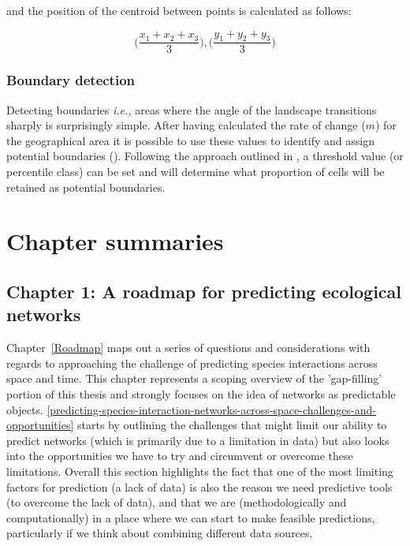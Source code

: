 \begin{refsection}
and the position of the centroid between points is calculated as follows:

$$ \Big( \frac{x_{1} + x_{2} + x_{3}}{3} \Big), \Big( \frac{y_{1} + y_{2} +
y_{3}}{3} \Big) $$

\subsubsection{Boundary detection}

Detecting boundaries \emph{i.e.,} areas where the angle of the landscape
transitions sharply is surprisingly simple. After having calculated the
rate of change (\(m\)) for the geographical area it is possible to use
these values to identify and assign potential boundaries
(\cite{Fortin2005SpaAna, Oden1993CatWom, Fortin1995DelEco}). Following the
approach outlined in \cite{Fortin2005SpaAna}, a threshold value (or
percentile class) can be set and will determine what proportion of cells
will be retained as potential boundaries.

\section{Chapter summaries}

\subsection{Chapter 1: A roadmap for predicting ecological networks}

Chapter~\ref{Roadmap} maps out a series of questions and considerations with regards to approaching the challenge of predicting species interactions across space and time. This chapter represents a scoping overview of the 'gap-filling' portion of this thesis and strongly focuses on the idea of networks as predictable objects. \autoref{predicting-species-interaction-networks-across-space-challenges-and-opportunities} starts by outlining the challenges that might limit our ability to predict networks (which is primarily due to a limitation in data) but also looks into the opportunities we have to try and circumvent or overcome these limitations. Overall this section highlights the fact that one of the most limiting factors for prediction (a lack of data) is also the reason we need predictive tools (to overcome the lack of data), and that we are (methodologically and computationally) in a place where we can start to make feasible predictions, particularly if we think about combining different data sources.


\end{refsection}
